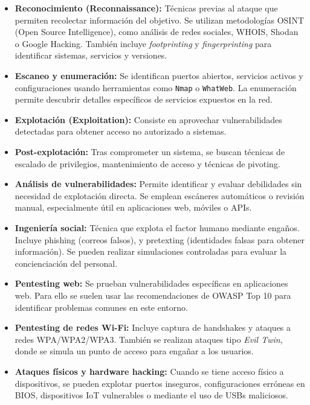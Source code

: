 \documentclass[a4paper, 10pt]{article}
\begin{document}
    \begin{itemize}
      \item \textbf{Reconocimiento (Reconnaissance):} Técnicas previas al ataque que permiten recolectar información del objetivo. Se utilizan metodologías OSINT (Open Source Intelligence), como análisis de redes sociales, WHOIS, Shodan o Google Hacking. También incluye \textit{footprinting} y \textit{fingerprinting} para identificar sistemas, servicios y versiones.
    
      \item \textbf{Escaneo y enumeración:} Se identifican puertos abiertos, servicios activos y configuraciones usando herramientas como \texttt{Nmap} o \texttt{WhatWeb}. La enumeración permite descubrir detalles específicos de servicios expuestos en la red.
    
      \item \textbf{Explotación (Exploitation):} Consiste en aprovechar vulnerabilidades detectadas para obtener acceso no autorizado a sistemas.
    
      \item \textbf{Post-explotación:} Tras comprometer un sistema, se buscan técnicas de escalado de privilegios, mantenimiento de acceso y técnicas de pivoting.
    
      \item \textbf{Análisis de vulnerabilidades:} Permite identificar y evaluar debilidades sin necesidad de explotación directa. Se emplean escáneres automáticos o revisión manual, especialmente útil en aplicaciones web, móviles o APIs.
    
      \item \textbf{Ingeniería social:} Técnica que explota el factor humano mediante engaños. Incluye phishing (correos falsos), y pretexting (identidades falsas para obtener información). Se pueden realizar simulaciones controladas para evaluar la concienciación del personal. 
    
      \item \textbf{Pentesting web:} Se prueban vulnerabilidades específicas en aplicaciones web. Para ello se suelen usar las recomendaciones de OWASP Top 10 para identificar problemas comunes en este entorno.
    
      \item \textbf{Pentesting de redes Wi-Fi:} Incluye captura de handshakes y ataques a redes WPA/WPA2/WPA3. También se realizan ataques tipo \textit{Evil Twin}, donde se simula un punto de acceso para engañar a los usuarios.
    
      \item \textbf{Ataques físicos y hardware hacking:} Cuando se tiene acceso físico a dispositivos, se pueden explotar puertos inseguros, configuraciones erróneas en BIOS, dispositivos IoT vulnerables o mediante el uso de USBs maliciosos.
    \end{itemize}
    
\end{document}
